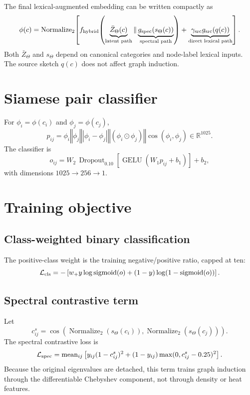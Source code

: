 \documentclass[11pt,a4paper]{article}
\newcommand{\R}{\mathbb{R}}
\newcommand{\concat}{\mathbin{\Vert}}
\newcommand{\sigmoid}{\operatorname{sigmoid}}
\newcommand{\Norm}{\operatorname{Normalize}_{2}}
\newcommand{\GELU}{\operatorname{GELU}}
\newcommand{\mean}{\operatorname{mean}}
\begin{document}
The final lexical-augmented embedding can be written compactly as
\begin{equation}
\phi(c)=\Norm\!\left[
f_{\rm hybrid}\!\left(
\underbrace{\bar Z_\Theta(c)}_{\text{latent path}}
\concat
\underbrace{g_{\rm spec}(s_\Theta(c))}_{\text{spectral path}}
\right)
+\underbrace{\gamma_{\rm src}g_{\rm src}(q(c))}_{\text{direct lexical path}}
\right].
\end{equation}
Both $\bar Z_\Theta$ and $s_\Theta$ depend on canonical categories and node-label
lexical inputs. The source sketch $q(c)$ does not affect graph induction.

\section{Siamese pair classifier}

For $\phi_i=\phi(c_i)$ and $\phi_j=\phi(c_j)$,
\begin{equation}
p_{ij}=
\phi_i\concat\phi_j\concat|\phi_i-\phi_j|
\concat(\phi_i\odot\phi_j)
\concat\cos(\phi_i,\phi_j)
\in\R^{1025}.
\end{equation}
The classifier is
\begin{equation}
o_{ij}=W_2\,
\operatorname{Dropout}_{0.10}
\left[\GELU(W_1p_{ij}+b_1)\right]+b_2,
\end{equation}
with dimensions $1025\rightarrow256\rightarrow1$.

\section{Training objective}

\subsection{Class-weighted binary classification}

The positive-class weight is the training negative/positive ratio, capped at ten:
\begin{equation}
\mathcal L_{\rm cls}
=-\left[w_+y\log\sigmoid(o)
+(1-y)\log(1-\sigmoid(o))\right].
\end{equation}

\subsection{Spectral contrastive term}

Let
\begin{equation}
c_{ij}^{s}
=\cos\!\left(\Norm(s_\Theta(c_i)),\Norm(s_\Theta(c_j))\right).
\end{equation}
The spectral contrastive loss is
\begin{equation}
\mathcal L_{\rm spec}
=\mean_{ij}\left[
y_{ij}(1-c_{ij}^{s})^2
+(1-y_{ij})\max(0,c_{ij}^{s}-0.25)^2
\right].
\end{equation}
Because the original eigenvalues are detached, this term trains graph induction
through the differentiable Chebyshev component, not through density or heat
features.
\end{document}
